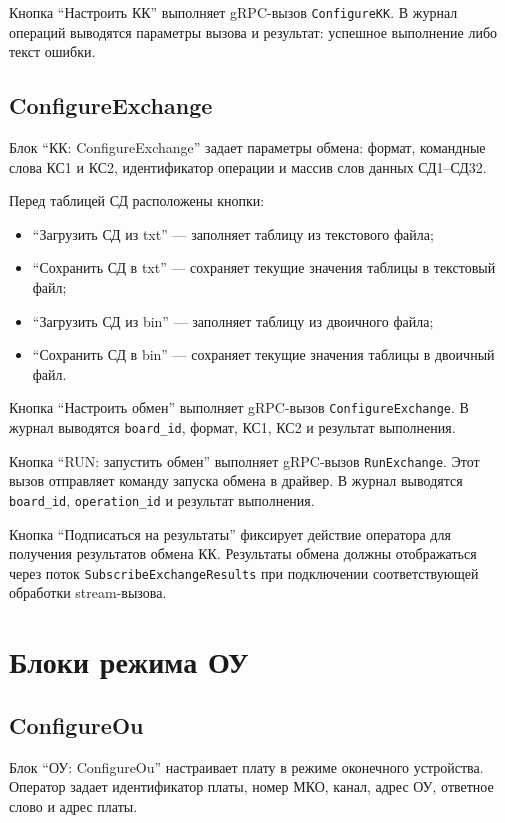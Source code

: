 Кнопка ``Настроить КК'' выполняет gRPC-вызов \texttt{ConfigureKK}. В журнал операций выводятся параметры вызова и результат: успешное выполнение либо текст ошибки.

\subsection{ConfigureExchange}

Блок ``КК: ConfigureExchange'' задает параметры обмена: формат, командные слова КС1 и КС2, идентификатор операции и массив слов данных СД1--СД32.

Перед таблицей СД расположены кнопки:

\begin{itemize}
	\item ``Загрузить СД из txt'' --- заполняет таблицу из текстового файла;
	\item ``Сохранить СД в txt'' --- сохраняет текущие значения таблицы в текстовый файл;
	\item ``Загрузить СД из bin'' --- заполняет таблицу из двоичного файла;
	\item ``Сохранить СД в bin'' --- сохраняет текущие значения таблицы в двоичный файл.
\end{itemize}

Кнопка ``Настроить обмен'' выполняет gRPC-вызов \texttt{ConfigureExchange}. В журнал выводятся \texttt{board\_id}, формат, КС1, КС2 и результат выполнения.

Кнопка ``RUN: запустить обмен'' выполняет gRPC-вызов \texttt{RunExchange}. Этот вызов отправляет команду запуска обмена в драйвер. В журнал выводятся \texttt{board\_id}, \texttt{operation\_id} и результат выполнения.

Кнопка ``Подписаться на результаты'' фиксирует действие оператора для получения результатов обмена КК. Результаты обмена должны отображаться через поток \texttt{SubscribeExchangeResults} при подключении соответствующей обработки stream-вызова.

\section{Блоки режима ОУ}

\subsection{ConfigureOu}

Блок ``ОУ: ConfigureOu'' настраивает плату в режиме оконечного устройства. Оператор задает идентификатор платы, номер МКО, канал, адрес ОУ, ответное слово и адрес платы.

